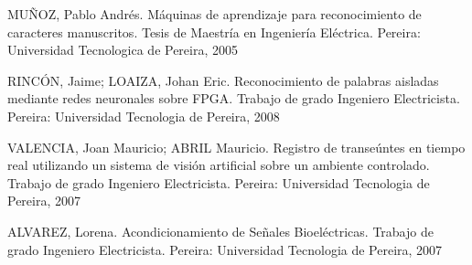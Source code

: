 \documentclass[a4paper, 12pt, oneside]{article}
\begin{document}
	MUÑOZ, Pablo Andrés. Máquinas de aprendizaje para reconocimiento de caracteres manuscritos. Tesis de Maestría en Ingeniería Eléctrica. Pereira: Universidad Tecnologica de Pereira, 2005
	
	RINCÓN, Jaime; LOAIZA, Johan Eric. Reconocimiento de palabras aisladas mediante redes neuronales sobre FPGA. Trabajo de grado Ingeniero Electricista. Pereira: Universidad Tecnologia de Pereira, 2008
	
	VALENCIA, Joan Mauricio; ABRIL Mauricio. Registro de transeúntes en tiempo real utilizando un sistema de visión artificial sobre un ambiente controlado. Trabajo de grado Ingeniero Electricista. Pereira: Universidad Tecnologia de Pereira, 2007
	
	ALVAREZ, Lorena. Acondicionamiento de Señales Bioeléctricas. Trabajo de grado Ingeniero Electricista. Pereira: Universidad Tecnologia de Pereira, 2007
	
	\clearpage
\end{document}
